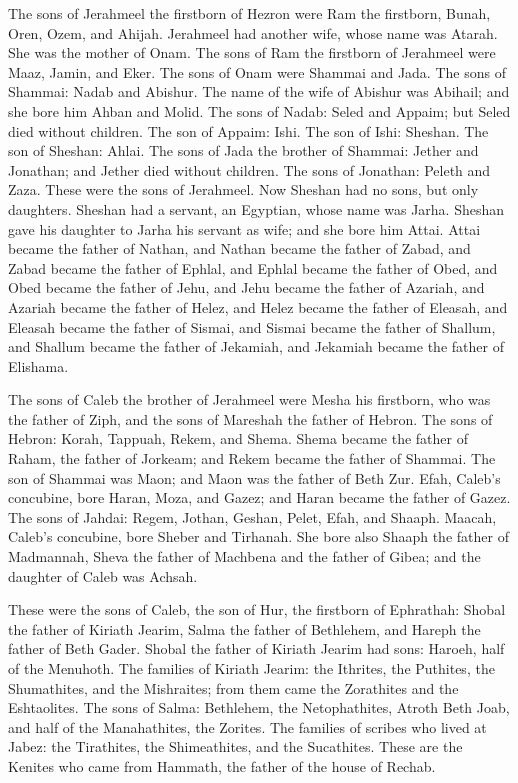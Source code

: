 \myverse{}The sons of Jerahmeel the firstborn of Hezron were Ram the firstborn,
Bunah, Oren, Ozem, and Ahijah.
\myverse{}Jerahmeel had another wife, whose name was Atarah. She was the mother of Onam.
\myverse{}The sons of Ram the firstborn of Jerahmeel were Maaz, Jamin, and Eker.
\myverse{}The sons of Onam were Shammai and Jada. The sons of Shammai: Nadab and Abishur.
\myverse{}The name of the wife of Abishur was Abihail; and she bore him Ahban and Molid.
\myverse{}The sons of Nadab: Seled and Appaim; but Seled died without children.
\myverse{}The son of Appaim: Ishi. The son of Ishi: Sheshan. The son of Sheshan: Ahlai.
\myverse{}The sons of Jada the brother of Shammai: Jether and Jonathan; and Jether died
without children.
\myverse{}The sons of Jonathan: Peleth and Zaza. These were the sons of Jerahmeel.
\myverse{}Now Sheshan had no sons, but only daughters. Sheshan had a servant, an Egyptian,
whose name was Jarha.
\myverse{}Sheshan gave his daughter to Jarha his servant as wife; and she bore him Attai.
\myverse{}Attai became the father of Nathan, and Nathan became the father of Zabad,
\myverse{}and Zabad became the father of Ephlal, and Ephlal became the father of Obed,
\myverse{}and Obed became the father of Jehu, and Jehu became the father of Azariah,
\myverse{}and Azariah became the father of Helez, and Helez became the father of Eleasah,
\myverse{}and Eleasah became the father of Sismai, and Sismai became the father of Shallum,
\myverse{}and Shallum became the father of Jekamiah, and Jekamiah became the father
of Elishama.

\myverse{}The sons of Caleb the brother of Jerahmeel were Mesha his firstborn,
who was the father of Ziph, and the sons of Mareshah the father of Hebron.
\myverse{}The sons of Hebron: Korah, Tappuah, Rekem, and Shema.
\myverse{}Shema became the father of Raham, the father of Jorkeam; and Rekem became
the father of Shammai.
\myverse{}The son of Shammai was Maon; and Maon was the father of Beth Zur.
\myverse{}Efah, Caleb’s concubine, bore Haran, Moza, and Gazez; and Haran became the
father of Gazez.
\myverse{}The sons of Jahdai: Regem, Jothan, Geshan, Pelet, Efah, and Shaaph.
\myverse{}Maacah, Caleb’s concubine, bore Sheber and Tirhanah.
\myverse{}She bore also Shaaph the father of Madmannah, Sheva the father of Machbena
and the father of Gibea; and the daughter of Caleb was Achsah.

\myverse{}These were the sons of Caleb, the son of Hur, the firstborn of
Ephrathah: Shobal the father of Kiriath Jearim,
\myverse{}Salma the father of Bethlehem, and Hareph the father of Beth Gader.
\myverse{}Shobal the father of Kiriath Jearim had sons: Haroeh, half of the Menuhoth.
\myverse{}The families of Kiriath Jearim: the Ithrites, the Puthites, the Shumathites,
and the Mishraites; from them came the Zorathites and the Eshtaolites.
\myverse{}The sons of Salma: Bethlehem, the Netophathites, Atroth Beth Joab, and half
of the Manahathites, the Zorites.
\myverse{}The families of scribes who lived at Jabez: the Tirathites, the Shimeathites,
and the Sucathites. These are the Kenites who came from Hammath, the father of the house of Rechab.


